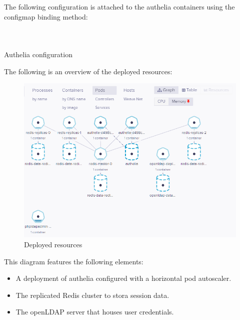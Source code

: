 The following configuration is attached to the authelia containers using the configmap binding method: 

\begin{listing}[H]
    \inputminted[firstline=1,lastline=25]{Yaml}{codeListing/authelia_configmap.yml}
\end{listing}

\begin{listing}[H]
    \inputminted[firstline=26,lastline=55]{Yaml}{codeListing/authelia_configmap.yml}
\end{listing}

\begin{listing}[H]
    \inputminted[firstline=56]{Yaml}{codeListing/authelia_configmap.yml}
    \caption{Authelia configuration}
    \label{lst:Authelia configuration}
\end{listing}


The following is an overview of the deployed resources: 
\begin{figure}[H]\centering
\includegraphics[width=1.0\textwidth,angle=00]{assets/f54.png}
\caption{Deployed resources}
\label{fig:f54}
\end{figure}


This diagram features the following elements: 

\begin{itemize}[label={--}]
\item A deployment of authelia configured with a horizontal pod autoscaler.  
\item The replicated Redis cluster to stora session data. 
\item The openLDAP server that houses user credentials. 
\end{itemize}


